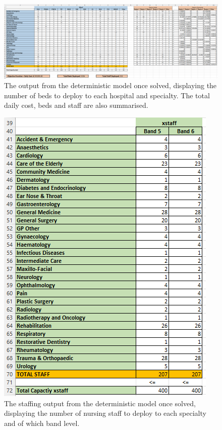 \documentclass[../thesis.tex]{subfiles}
\begin{document}
\begin{landscape}
\begin{figure}[h!]
    \centering
    \includegraphics[scale=0.7]{Chapters/Chapter7/Figures/Deterministic1.png}
    \caption{The output from the deterministic model once solved, displaying the number of beds to deploy to each hospital and specialty. The total daily cost, beds and staff are also summarised. }
    \label{fig:exdm1a}
\end{figure}
\end{landscape}
\begin{figure}[h!]
    \centering
    \includegraphics[scale=0.8]{Chapters/Chapter7/Figures/deterministic2.png}
    \caption{The staffing output from the deterministic model once solved, displaying the number of nursing staff to deploy to each specialty and of which band level.}
    \label{fig:exdm2a}
\end{figure}
\end{document}
